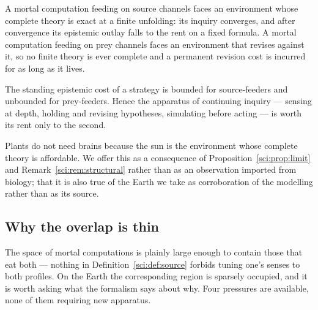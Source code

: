\begin{proposition}
\label{sci:prop:twosciences}
A mortal computation feeding on source channels faces an environment whose complete theory is exact at
a finite unfolding: its inquiry converges, and after convergence its epistemic outlay falls to the
rent on a fixed formula. A mortal computation feeding on prey channels faces an environment that
revises against it, so no finite theory is ever complete and a permanent revision cost is incurred for
as long as it lives.
\end{proposition}

\begin{corollary}
\label{sci:cor:intelligence}
The standing epistemic cost of a strategy is bounded for source-feeders and unbounded for prey-feeders.
Hence the apparatus of continuing inquiry --- sensing at depth, holding and revising hypotheses,
simulating before acting --- is worth its rent only to the second.
\end{corollary}

Plants do not need brains because the sun is the environment whose complete theory is affordable. We
offer this as a consequence of Proposition~\ref{sci:prop:limit} and Remark~\ref{sci:rem:structural} rather
than as an observation imported from biology; that it is also true of the Earth we take as
corroboration of the modelling rather than as its source.

\subsection{Why the overlap is thin}\label{sci:S11.4}

The space of mortal computations is plainly large enough to contain those that eat both --- nothing in
Definition~\ref{sci:def:source} forbids tuning one's senses to both profiles. On the Earth the
corresponding region is sparsely occupied, and it is worth asking what the formalism says about why.
Four pressures are available, none of them requiring new apparatus.

